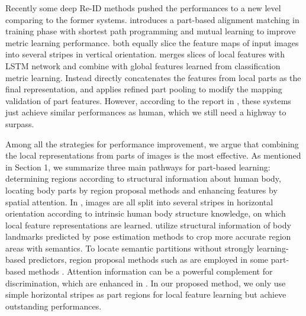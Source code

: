 \documentclass[sigconf]{acmart}
\begin{document}
Recently some deep Re-ID methods pushed the performances to a new level comparing to the former systems. \cite{zhang2017alignedreid} introduces a part-based alignment matching in training phase with shortest path programming and mutual learning to improve metric learning performance. \cite{bai2017deep, sun2017beyond} both equally slice the feature maps of input images into several stripes in vertical orientation. \cite{bai2017deep} merges slices of local features with LSTM network and combine with global features learned from classification metric learning. Instead \cite{sun2017beyond} directly concatenates the features from local parts as the final representation, and applies refined part pooling to modify the mapping validation of part features. However, according to the report in \cite{zhang2017alignedreid}, these systems just achieve similar performances as human, which we still need a highway to surpass. 

Among all the strategies for performance improvement, we argue that combining the local representations from parts of images is the most effective. As mentioned in Section 1, we summarize three main pathways for part-based learning: determining regions according to structural information about human body, locating body parts by region proposal methods and enhancing features by spatial attention. In \cite{cheng2016perso,li2017person,sun2017beyond}, images are all split into several stripes in horizontal orientation according to intrinsic human body structure knowledge, on which local feature representations are learned. \cite{zhao2017spindle,su2017pose} utilize structural information of body landmarks predicted by pose estimation methods to crop more accurate region areas with semantics. To locate semantic partitions without strongly learning-based predictors, region proposal methods such as \cite{girshick2015fast,jaderberg2015spatial} are employed in some part-based methods \cite{liu2017hydraplus,yao2017deep,zhao2017deeply,li2017learning,li2018harmoniou}. Attention information can be a powerful complement for discrimination, which are enhanced in \cite{liu2017end,liu2017hydraplus,li2018harmoniou}. In our proposed method, we only use simple horizontal stripes as part regions for local feature learning but achieve outstanding performances. 
\end{document}
